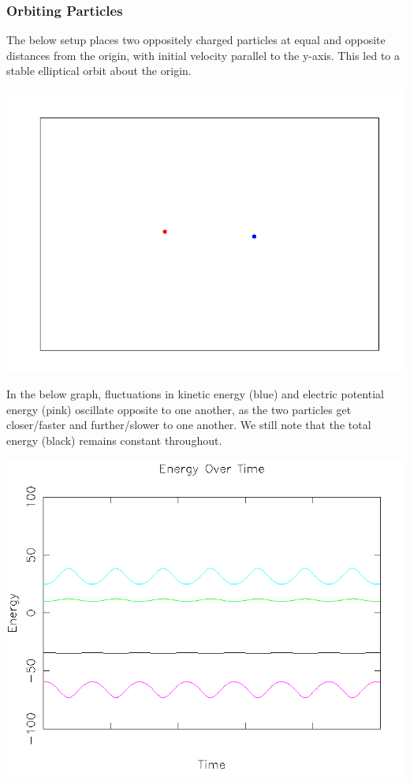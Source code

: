 \documentclass{article}
\begin{document}
\subsubsection{Orbiting Particles}
The below setup places two oppositely charged particles at equal and opposite distances from the origin, with initial velocity parallel to the y-axis.
This led to a stable elliptical orbit about the origin.
\\
\begin{center}
    \includegraphics[scale=0.5]{orbit}
\end{center}

In the below graph, fluctuations in kinetic energy (blue) and electric potential energy (pink) oscillate opposite to one another,
as the two particles get closer/faster and further/slower to one another.
We still note that the total energy (black) remains constant throughout.
\\
\begin{center}
    \includegraphics[scale=0.5]{orbit_energy}
\end{center}
\end{document}
